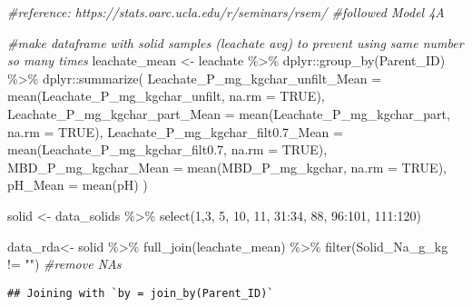 \documentclass[
]{article}
\newenvironment{Shaded}{\begin{snugshade}}{\end{snugshade}}
\newcommand{\AttributeTok}[1]{\textcolor[rgb]{0.77,0.63,0.00}{#1}}
\newcommand{\CommentTok}[1]{\textcolor[rgb]{0.56,0.35,0.01}{\textit{#1}}}
\newcommand{\ConstantTok}[1]{\textcolor[rgb]{0.00,0.00,0.00}{#1}}
\newcommand{\DecValTok}[1]{\textcolor[rgb]{0.00,0.00,0.81}{#1}}
\newcommand{\FloatTok}[1]{\textcolor[rgb]{0.00,0.00,0.81}{#1}}
\newcommand{\FunctionTok}[1]{\textcolor[rgb]{0.00,0.00,0.00}{#1}}
\newcommand{\NormalTok}[1]{#1}
\newcommand{\OtherTok}[1]{\textcolor[rgb]{0.56,0.35,0.01}{#1}}
\newcommand{\SpecialCharTok}[1]{\textcolor[rgb]{0.00,0.00,0.00}{#1}}
\newcommand{\StringTok}[1]{\textcolor[rgb]{0.31,0.60,0.02}{#1}}
\begin{document}
\begin{Shaded}
\begin{Highlighting}[]
\CommentTok{\#reference: https://stats.oarc.ucla.edu/r/seminars/rsem/ \#followed Model 4A}

\CommentTok{\#make dataframe with solid samples (leachate avg) to prevent using same number so many times}
\NormalTok{leachate\_mean }\OtherTok{\textless{}{-}}\NormalTok{ leachate }\SpecialCharTok{\%\textgreater{}\%}
\NormalTok{  dplyr}\SpecialCharTok{::}\FunctionTok{group\_by}\NormalTok{(Parent\_ID) }\SpecialCharTok{\%\textgreater{}\%}
\NormalTok{  dplyr}\SpecialCharTok{::}\FunctionTok{summarize}\NormalTok{(}
    \AttributeTok{Leachate\_P\_mg\_kgchar\_unfilt\_Mean =} \FunctionTok{mean}\NormalTok{(Leachate\_P\_mg\_kgchar\_unfilt, }\AttributeTok{na.rm =} \ConstantTok{TRUE}\NormalTok{),}
    \AttributeTok{Leachate\_P\_mg\_kgchar\_part\_Mean =} \FunctionTok{mean}\NormalTok{(Leachate\_P\_mg\_kgchar\_part, }\AttributeTok{na.rm =} \ConstantTok{TRUE}\NormalTok{),}
    \AttributeTok{Leachate\_P\_mg\_kgchar\_filt0.7\_Mean =} \FunctionTok{mean}\NormalTok{(Leachate\_P\_mg\_kgchar\_filt0}\FloatTok{.7}\NormalTok{, }\AttributeTok{na.rm =} \ConstantTok{TRUE}\NormalTok{),}
    \AttributeTok{MBD\_P\_mg\_kgchar\_Mean =} \FunctionTok{mean}\NormalTok{(MBD\_P\_mg\_kgchar, }\AttributeTok{na.rm =} \ConstantTok{TRUE}\NormalTok{),}
    \AttributeTok{pH\_Mean =} \FunctionTok{mean}\NormalTok{(pH)}
\NormalTok{  )}

\NormalTok{solid }\OtherTok{\textless{}{-}}\NormalTok{ data\_solids }\SpecialCharTok{\%\textgreater{}\%}
  \FunctionTok{select}\NormalTok{(}\DecValTok{1}\NormalTok{,}\DecValTok{3}\NormalTok{, }\DecValTok{5}\NormalTok{, }\DecValTok{10}\NormalTok{, }\DecValTok{11}\NormalTok{, }\DecValTok{31}\SpecialCharTok{:}\DecValTok{34}\NormalTok{, }\DecValTok{88}\NormalTok{, }\DecValTok{96}\SpecialCharTok{:}\DecValTok{101}\NormalTok{, }\DecValTok{111}\SpecialCharTok{:}\DecValTok{120}\NormalTok{)}

\NormalTok{data\_rda}\OtherTok{\textless{}{-}}\NormalTok{ solid }\SpecialCharTok{\%\textgreater{}\%}
  \FunctionTok{full\_join}\NormalTok{(leachate\_mean) }\SpecialCharTok{\%\textgreater{}\%}
  \FunctionTok{filter}\NormalTok{(Solid\_Na\_g\_kg }\SpecialCharTok{!=} \StringTok{""}\NormalTok{) }\CommentTok{\#remove NAs}
\end{Highlighting}
\end{Shaded}

\begin{verbatim}
## Joining with `by = join_by(Parent_ID)`
\end{verbatim}
\end{document}
